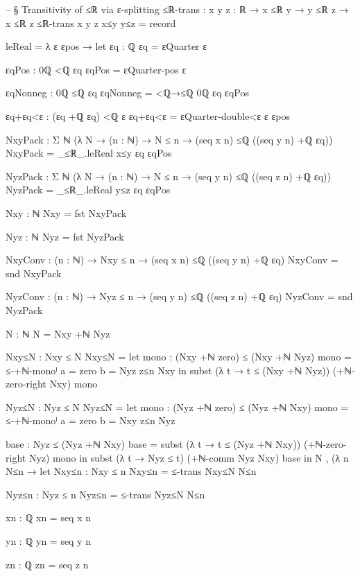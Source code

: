 \documentclass[11pt,a4paper]{book}
\begin{document}
\begin{code}
-- § Transitivity of ≤ℝ via ε-splitting
≤ℝ-trans : {x y z : ℝ} → x ≤ℝ y → y ≤ℝ z → x ≤ℝ z
≤ℝ-trans {x} {y} {z} x≤y y≤z = record
  { leReal = λ ε εpos →
      let
        εq : ℚ
        εq = εQuarter ε

        εqPos : 0ℚ <ℚ εq
        εqPos = εQuarter-pos ε

        εqNonneg : 0ℚ ≤ℚ εq
        εqNonneg = <ℚ→≤ℚ {0ℚ} {εq} εqPos

        εq+εq<ε : (εq +ℚ εq) <ℚ ε
        εq+εq<ε = εQuarter-double<ε ε εpos

        NxyPack : Σ ℕ (λ N → (n : ℕ) → N ≤ n → (seq x n) ≤ℚ ((seq y n) +ℚ εq))
        NxyPack = _≤ℝ_.leReal x≤y εq εqPos

        NyzPack : Σ ℕ (λ N → (n : ℕ) → N ≤ n → (seq y n) ≤ℚ ((seq z n) +ℚ εq))
        NyzPack = _≤ℝ_.leReal y≤z εq εqPos

        Nxy : ℕ
        Nxy = fst NxyPack

        Nyz : ℕ
        Nyz = fst NyzPack

        NxyConv : (n : ℕ) → Nxy ≤ n → (seq x n) ≤ℚ ((seq y n) +ℚ εq)
        NxyConv = snd NxyPack

        NyzConv : (n : ℕ) → Nyz ≤ n → (seq y n) ≤ℚ ((seq z n) +ℚ εq)
        NyzConv = snd NyzPack

        N : ℕ
        N = Nxy +ℕ Nyz

        Nxy≤N : Nxy ≤ N
        Nxy≤N =
          let
            mono : (Nxy +ℕ zero) ≤ (Nxy +ℕ Nyz)
            mono = ≤-+ℕ-monoˡ {a = zero} {b = Nyz} z≤n Nxy
          in
          subst (λ t → t ≤ (Nxy +ℕ Nyz)) (+ℕ-zero-right Nxy) mono

        Nyz≤N : Nyz ≤ N
        Nyz≤N =
          let
            mono : (Nyz +ℕ zero) ≤ (Nyz +ℕ Nxy)
            mono = ≤-+ℕ-monoˡ {a = zero} {b = Nxy} z≤n Nyz

            base : Nyz ≤ (Nyz +ℕ Nxy)
            base = subst (λ t → t ≤ (Nyz +ℕ Nxy)) (+ℕ-zero-right Nyz) mono
          in
          subst (λ t → Nyz ≤ t) (+ℕ-comm Nyz Nxy) base
      in
      N , (λ n N≤n →
        let
          Nxy≤n : Nxy ≤ n
          Nxy≤n = ≤-trans Nxy≤N N≤n

          Nyz≤n : Nyz ≤ n
          Nyz≤n = ≤-trans Nyz≤N N≤n

          xn : ℚ
          xn = seq x n

          yn : ℚ
          yn = seq y n

          zn : ℚ
          zn = seq z n

}
\end{code}
\end{document}
